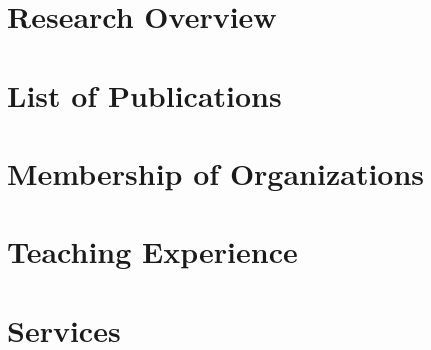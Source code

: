 \documentclass[]{res}
\begin{document}
\begin{resume}
\section{Research Overview}
\vspace*{0.1in}
 


\section{List of Publications}
\vspace*{0.2in}


\section{Membership of Organizations}
\vspace*{0.2in}


\section{Teaching Experience}
\vspace*{0.2in}


\section{Services}
\vspace*{0.2in}

\end{resume}
\end{document}
